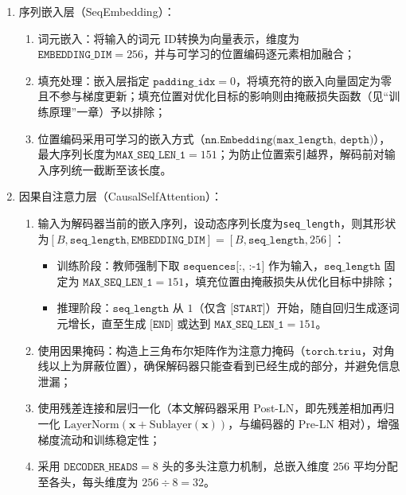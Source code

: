 \begin{enumerate}[label={（\arabic*）}, leftmargin=2em, labelsep=0.5em, itemsep=0pt]
    \item 序列嵌入层（SeqEmbedding）：
        \begin{enumerate}[label={（\alph*）}, leftmargin=2em, labelsep=0.5em, itemsep=0pt]
            \item 词元嵌入：将输入的词元 ID转换为向量表示，维度为$\texttt{EMBEDDING\_DIM}=256$，并与可学习的位置编码逐元素相加融合；
            \item 填充处理：嵌入层指定 $\texttt{padding\_idx}=0$，将填充符的嵌入向量固定为零且不参与梯度更新；填充位置对优化目标的影响则由掩蔽损失函数（见“训练原理”一章）予以排除；
            \item 位置编码采用可学习的嵌入方式（$\texttt{nn.Embedding(max\_length, depth)}$），最大序列长度为$\texttt{MAX\_SEQ\_LEN\_1}=151$；为防止位置索引越界，解码前对输入序列统一截断至该长度。
        \end{enumerate}
    \item 因果自注意力层（CausalSelfAttention）：
        \begin{enumerate}[label={（\alph*）}, leftmargin=2em, labelsep=0.5em, itemsep=0pt]
            \item 输入为解码器当前的嵌入序列，设动态序列长度为\texttt{seq\_length}，则其形状为$[B, \texttt{seq\_length}, \texttt{EMBEDDING\_DIM}] = [B, \texttt{seq\_length}, 256]$：
                \begin{itemize}
                    \item 训练阶段：教师强制下取 $\texttt{sequences[:, :-1]}$ 作为输入，$\texttt{seq\_length}$ 固定为 $\texttt{MAX\_SEQ\_LEN\_1}=151$，填充位置由掩蔽损失从优化目标中排除；
                    \item 推理阶段：$\texttt{seq\_length}$ 从 $1$（仅含 $\texttt{[START]}$）开始，随自回归生成逐词元增长，直至生成 $\texttt{[END]}$ 或达到 $\texttt{MAX\_SEQ\_LEN\_1}=151$。
                \end{itemize}
            \item 使用因果掩码：构造上三角布尔矩阵作为注意力掩码（$\texttt{torch.triu}$，对角线以上为屏蔽位置），确保解码器只能查看到已经生成的部分，并避免信息泄漏；
            \item 使用残差连接和层归一化（本文解码器采用 Post-LN，即先残差相加再归一化 $\text{LayerNorm}(\boldsymbol{x}+\text{Sublayer}(\boldsymbol{x}))$，与编码器的 Pre-LN 相对），增强梯度流动和训练稳定性；
            \item 采用 $\texttt{DECODER\_HEADS}=8$ 头的多头注意力机制，总嵌入维度 $256$ 平均分配至各头，每头维度为 $256 \div 8 = 32$。

\end{enumerate}
\end{enumerate}
